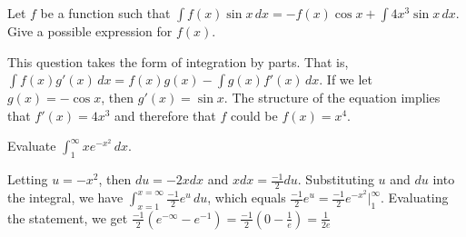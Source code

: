 \begin{Exercise}[label=int_meth3]
Let $f$ be a function such that $\int f(x) \sin{x}\,dx = -f(x)\cos{x} 
+ \int 4x^3 \sin{x}\,dx$. Give a possible expression for $f(x)$. 
\end{Exercise}

\begin{Answer}[ref=int_meth3]
This question takes the form of integration by parts. That is, $\int 
f(x)g'(x)\,dx = f(x)g(x) - \int g(x)f'(x)\,dx$. If we let $g(x) = 
-\cos{x}$, then $g'(x) =\sin{x}$. The structure of the equation 
implies that $f'(x) = 4x^3$ and therefore that $f$ could be $f(x) = 
x^4$. 
\end{Answer}

\begin{Exercise}[label=int_meth4]
Evaluate $\int_1^{\infty}xe^{-x^2}\,dx$. 
\end{Exercise}

\begin{Answer}[ref=int_meth4]
Letting $u = -x^2$, then $du = -2x dx$ and $x dx = \frac{-1}{2}du$. 
Substituting $u$ and $du$ into the integral, we have $\int_{x = 1}^{x 
= \infty} \frac{-1}{2}e^u\,du$, which equals $\frac{-1}{2}e^u = 
\frac{-1}{2}e^{-x^2}|_1^{\infty}$. Evaluating the statement, we get 
$\frac{-1}{2}(e^{-\infty} - e^{-1}) = \frac{-1}{2}(0-\frac{1}{e}) = 
\frac{1}{2e}$
\end{Answer}